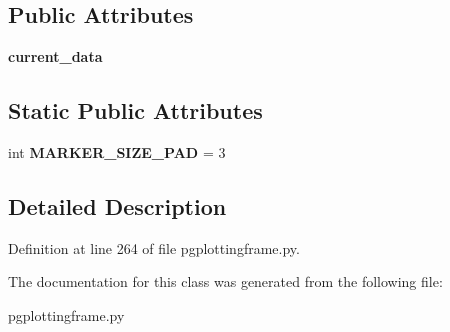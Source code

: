 \subsection*{Public Attributes}
\begin{DoxyCompactItemize}
\item 
{\bfseries current\+\_\+data}\hypertarget{classnegui_1_1pgplottingframe_1_1PGPlottingFrame2DLines_afa62ad8aa0cf1eecd6c5a2968106e94c}{}\label{classnegui_1_1pgplottingframe_1_1PGPlottingFrame2DLines_afa62ad8aa0cf1eecd6c5a2968106e94c}

\end{DoxyCompactItemize}
\subsection*{Static Public Attributes}
\begin{DoxyCompactItemize}
\item 
int {\bfseries M\+A\+R\+K\+E\+R\+\_\+\+S\+I\+Z\+E\+\_\+\+P\+AD} = 3\hypertarget{classnegui_1_1pgplottingframe_1_1PGPlottingFrame2DLines_a556d8b9b3132404b263900f82807e196}{}\label{classnegui_1_1pgplottingframe_1_1PGPlottingFrame2DLines_a556d8b9b3132404b263900f82807e196}

\end{DoxyCompactItemize}


\subsection{Detailed Description}


Definition at line 264 of file pgplottingframe.\+py.



The documentation for this class was generated from the following file\+:\begin{DoxyCompactItemize}
\item 
pgplottingframe.\+py\end{DoxyCompactItemize}
